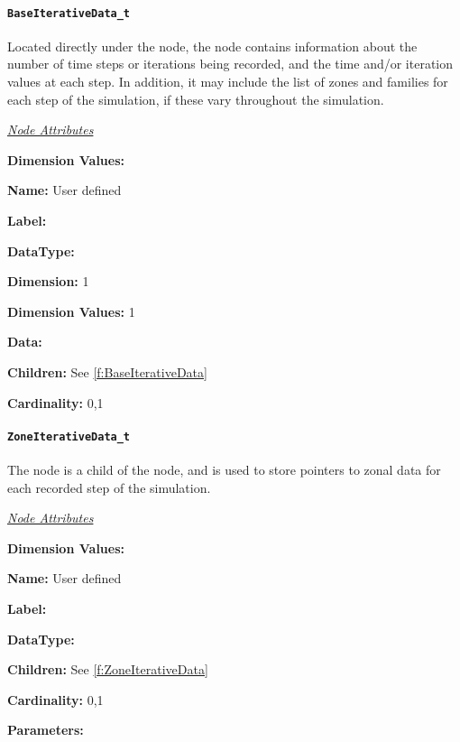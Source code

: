 \paragraph{\texttt{BaseIterativeData\_t}}

Located directly under the  node, the
 node contains information about the number
of time steps or iterations being recorded, and the time and/or
iteration values at each step.
In addition, it may include the list of zones and families for each step
of the simulation, if these vary throughout the simulation.

\textit{\uline{Node Attributes}}
\begin{Ventryic}{\textbf{Dimension Values:}}
\item [\textbf{Name:}]
      User defined
\item [\textbf{Label:}]
\item [\textbf{DataType:}]
\item [\textbf{Dimension:}]
      1
\item [\textbf{Dimension Values:}]
      1
\item [\textbf{Data:}]
\item [\textbf{Children:}]
      See \autoref{f:BaseIterativeData}
\item [\textbf{Cardinality:}]
      0,1
\end{Ventryic}

\paragraph{\texttt{ZoneIterativeData\_t}}

The  node is a child of the 
node, and is used to store pointers to zonal data for each recorded
step of the simulation.

\textit{\uline{Node Attributes}}
\begin{Ventryic}{\textbf{Dimension Values:}}
\item [\textbf{Name:}]
      User defined
\item [\textbf{Label:}]
\item [\textbf{DataType:}]
\item [\textbf{Children:}]
      See \autoref{f:ZoneIterativeData}
\item [\textbf{Cardinality:}]
      0,1
\item [\textbf{Parameters:}]
\end{Ventryic}

